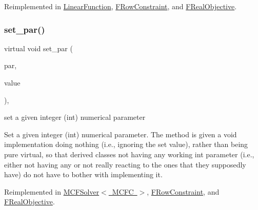 Reimplemented in \mbox{\hyperlink{class_s_m_spp__di__unipi__it_1_1_linear_function_af7a4779f8aa872d4a7ed3d2e0e62d29c}{Linear\+Function}}, \mbox{\hyperlink{class_s_m_spp__di__unipi__it_1_1_f_row_constraint_afca3d4682961381f16cb8e0b5b88e81e}{F\+Row\+Constraint}}, and \mbox{\hyperlink{class_s_m_spp__di__unipi__it_1_1_f_real_objective_afca3d4682961381f16cb8e0b5b88e81e}{F\+Real\+Objective}}.

\mbox{\label{class_s_m_spp__di__unipi__it_1_1_thin_compute_interface_a73669f587bb938b587c54ad7e73ec297}} 
\subsubsection{\texorpdfstring{set\+\_\+par()}{set\_par()}\hspace{0.1cm}{\footnotesize\ttfamily [1/3]}}
{\footnotesize\ttfamily virtual void set\+\_\+par (\begin{DoxyParamCaption}\item[{const \mbox{\hyperlink{class_s_m_spp__di__unipi__it_1_1_thin_compute_interface_aa3d710629ad8c434286726ad810c3b47}{idx\+\_\+type}}}]{par,  }\item[{const int}]{value }\end{DoxyParamCaption})\hspace{0.3cm}{\ttfamily [inline]}, {\ttfamily [virtual]}}



set a given integer (int) numerical parameter 

Set a given integer (int) numerical parameter. The method is given a void implementation doing nothing (i.\+e., ignoring the set value), rather than being pure virtual, so that derived classes not having any working int parameter (i.\+e., either not having any or not really reacting to the ones that they supposedly have) do not have to bother with implementing it. 

Reimplemented in \mbox{\hyperlink{class_s_m_spp__di__unipi__it_1_1_m_c_f_solver_ab8ce512bc43533d07e9ebf93d44c515d}{M\+C\+F\+Solver$<$ M\+C\+F\+C $>$}}, \mbox{\hyperlink{class_s_m_spp__di__unipi__it_1_1_f_row_constraint_ab8ce512bc43533d07e9ebf93d44c515d}{F\+Row\+Constraint}}, and \mbox{\hyperlink{class_s_m_spp__di__unipi__it_1_1_f_real_objective_ab8ce512bc43533d07e9ebf93d44c515d}{F\+Real\+Objective}}.

